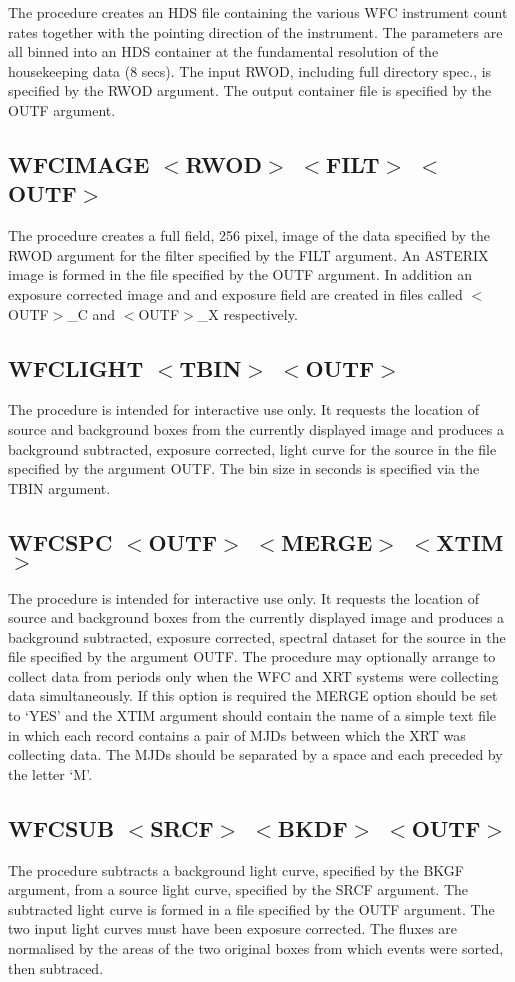 The procedure creates an HDS file containing the various WFC instrument
count rates together with the pointing direction of the instrument.
The parameters are all binned into an HDS container at the fundamental
resolution of the housekeeping data (8 secs). The input RWOD, including
full directory spec., is specified by the RWOD argument. The output 
container file is specified by the OUTF argument.

\subsection{WFCIMAGE $<$RWOD$>$ $<$FILT$>$ $<$OUTF$>$}

The procedure creates a full field, 256 pixel, image of the
data specified by the RWOD argument for the filter specified by the
FILT argument. An ASTERIX image is formed in the file specified
by the OUTF argument. In addition an exposure corrected image and
and exposure field are created in files called $<$OUTF$>$\_C 
and $<$OUTF$>$\_X respectively.

\subsection{WFCLIGHT $<$TBIN$>$ $<$OUTF$>$}

The procedure is intended for interactive use only. It requests the
location of source and background boxes from the currently displayed
image and produces a background subtracted, exposure corrected, light
curve for the source in the file specified by the argument OUTF. The
bin size in seconds is specified via the TBIN argument.

\subsection{WFCSPC $<$OUTF$>$ $<$MERGE$>$ $<$XTIM$>$}
The procedure is intended for interactive use only. It requests the
location of source and background boxes from the currently displayed
image and produces a background subtracted, exposure corrected, spectral
dataset for the source in the file specified by the argument OUTF.
The procedure may optionally arrange to collect data from periods only
when the WFC and XRT systems were collecting data simultaneously. If
this option is required the MERGE option should be set to `YES' and
the XTIM argument should contain the name of a simple text file
in which each record contains a pair of MJDs between which the XRT
was collecting data. The MJDs should be separated by a space 
and each preceded by the letter `M'.

\subsection{WFCSUB $<$SRCF$>$ $<$BKDF$>$ $<$OUTF$>$}
The procedure subtracts a background light curve, specified by the
BKGF argument, from a source light curve, specified by the SRCF
argument. The subtracted light curve is formed in a file specified
by the OUTF argument. The two input light curves must have been
exposure corrected. The fluxes are normalised by the areas of the
two original boxes from which events were sorted, then subtraced.


